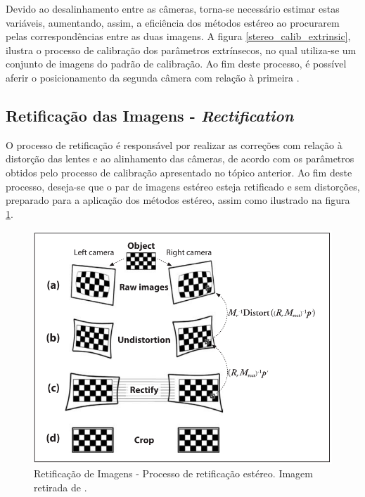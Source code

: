 Devido ao desalinhamento entre as câmeras, torna-se necessário estimar estas variáveis, aumentando, assim, a eficiência dos métodos estéreo ao procurarem pelas correspondências entre as duas imagens. A figura \ref{stereo_calib_extrinsic}, ilustra o processo de calibração dos parâmetros extrínsecos, no qual utiliza-se um conjunto de imagens do padrão de calibração. Ao fim deste processo, é possível aferir o posicionamento da segunda câmera com relação à primeira \cite{Bouguet1999}.


\subsection{Retificação das Imagens - \textit{Rectification}}

O processo de retificação é responsável por realizar as correções com relação à distorção das lentes e ao alinhamento das câmeras, de acordo com os parâmetros obtidos pelo processo de calibração apresentado no tópico anterior. Ao fim deste processo, deseja-se que o par de imagens estéreo esteja retificado e sem distorções, preparado para a aplicação dos métodos estéreo, assim como ilustrado na figura \ref{rectification_process}.

\begin{figure}[H]
 	\centering
 	\includegraphics[scale=0.32]{./Resources/bradski/rectification_process.png}
 	\caption{Retificação de Imagens - Processo de retificação estéreo. Imagem retirada de \cite{Bradski2008}.}
 	\label{rectification_process}
\end{figure}


